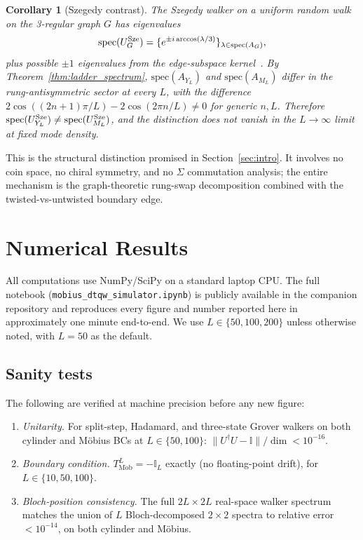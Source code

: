 \documentclass[aps,pra,reprint,amsmath,amssymb,superscriptaddress,nofootinbib,longbibliography]{revtex4-2}
\newcommand{\I}{\mathbb{I}}
\newcommand{\Mob}{\mathrm{M\ddot{o}b}}
\newtheorem{corollary}{Corollary}
\begin{document}
\begin{corollary}[Szegedy contrast]
\label{thm:szegedy_contrast}
The Szegedy walker on a uniform random walk on the 3-regular graph $G$ has eigenvalues
\begin{equation}
\mathrm{spec}(U^{\rm Sze}_G) = \{e^{\pm i \arccos(\lambda/3)}\}_{\lambda \in \mathrm{spec}(A_G)},
\end{equation}
plus possible $\pm 1$ eigenvalues from the edge-subspace kernel~\cite{szegedy2004}. By Theorem~\ref{thm:ladder_spectrum}, $\mathrm{spec}(A_{Y_L})$ and $\mathrm{spec}(A_{M_L})$ differ in the rung-antisymmetric sector at every $L$, with the difference $2\cos((2n+1)\pi/L) - 2\cos(2\pi n/L) \neq 0$ for generic $n, L$. Therefore $\mathrm{spec}(U^{\rm Sze}_{Y_L}) \neq \mathrm{spec}(U^{\rm Sze}_{M_L})$, and the distinction does not vanish in the $L \to \infty$ limit at fixed mode density.
\end{corollary}

This is the structural distinction promised in Section~\ref{sec:intro}. It involves no coin space, no chiral symmetry, and no $\Sigma$ commutation analysis; the entire mechanism is the graph-theoretic rung-swap decomposition combined with the twisted-vs-untwisted boundary edge.


\section{Numerical Results}
\label{sec:numerics}

All computations use NumPy/SciPy on a standard laptop CPU. The full notebook (\texttt{mobius\_dtqw\_simulator.ipynb}) is publicly available in the companion repository and reproduces every figure and number reported here in approximately one minute end-to-end. We use $L \in \{50, 100, 200\}$ unless otherwise noted, with $L = 50$ as the default.

\subsection{Sanity tests}

The following are verified at machine precision before any new figure:
\begin{enumerate}
\item \emph{Unitarity.} For split-step, Hadamard, and three-state Grover walkers on both cylinder and M\"obius BCs at $L \in \{50, 100\}$: $\|U^\dagger U - \I\|/\dim < 10^{-16}$.
\item \emph{Boundary condition.} $T_\Mob^L = -\I_L$ exactly (no floating-point drift), for $L \in \{10, 50, 100\}$.
\item \emph{Bloch-position consistency.} The full $2L \times 2L$ real-space walker spectrum matches the union of $L$ Bloch-decomposed $2 \times 2$ spectra to relative error $< 10^{-14}$, on both cylinder and M\"obius.
\end{enumerate}
\end{document}
